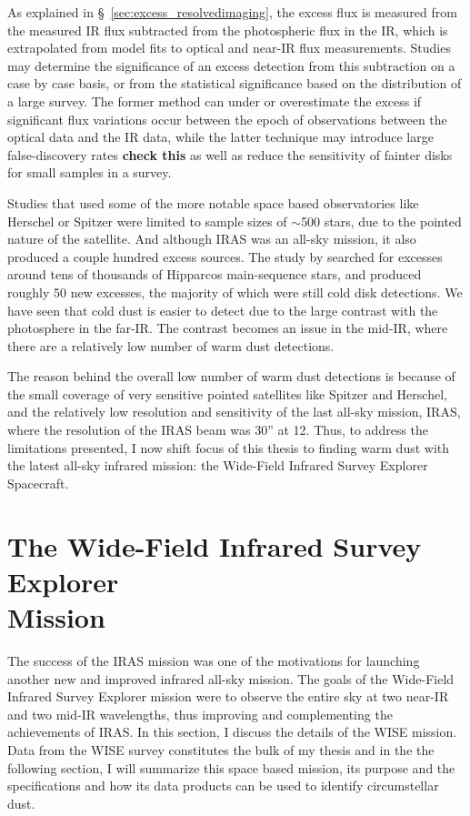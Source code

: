    As explained in \S~\ref{sec:excess_resolvedimaging}, the excess flux is measured from the measured IR flux subtracted from the photospheric flux in the IR, which is extrapolated from model fits to optical and near-IR flux measurements. Studies may determine the significance of an excess detection from this subtraction on a case by case basis, or from the statistical significance based on the distribution of a large survey. The former method can under or overestimate the excess if significant flux variations occur between the epoch of observations between the optical data and the IR data, while the latter technique may introduce large false-discovery rates \textbf{check this} as well as reduce the sensitivity of fainter disks for small samples in a survey. 
   
   Studies that used some of the more notable space based observatories like Herschel or Spitzer were limited to sample sizes of $\sim$500 stars, due to the pointed nature of the satellite. And although IRAS was an all-sky mission, it also produced a couple hundred excess sources. The study by \citet{Rhee2007} searched for excesses around tens of thousands of Hipparcos main-sequence stars, and produced roughly 50 new excesses, the majority of which were still cold disk detections. We have seen that cold dust is easier to detect due to the large contrast with the photosphere in the far-IR. The contrast becomes an issue in the mid-IR, where there are a relatively low number of warm dust detections.
   
   The reason behind the overall low number of warm dust detections is because of the small coverage of very sensitive pointed satellites like Spitzer and Herschel, and the relatively low resolution and sensitivity of the last all-sky mission, IRAS, where the resolution of the IRAS beam was 30'' at 12\micron. Thus, to address the limitations presented, I now shift focus of this thesis to finding warm dust with the latest all-sky infrared mission: the Wide-Field Infrared Survey Explorer Spacecraft.
   
   
\section{The Wide-Field Infrared Survey Explorer\\ Mission}\label{sec:wise_intro}

    The success of the IRAS mission was one of the motivations for launching another new and improved infrared all-sky mission. The goals of the Wide-Field Infrared Survey Explorer mission \citep[WISE;][]{Wright2010} were to observe the entire sky at two near-IR and two mid-IR wavelengths, thus improving and complementing the achievements of IRAS. In this section, I discuss the details of the WISE mission. Data from the WISE survey constitutes the bulk of my thesis and in the the following section, I will summarize this space based mission, its purpose and the specifications and how its data products can be used to identify circumstellar dust.
   

